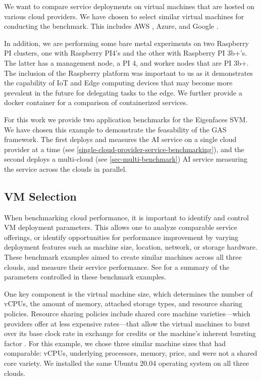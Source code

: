 We want to compare service
deployments on virtual machines that are hosted on various cloud
providers. We have chosen to select similar virtual machines for
conducting the benchmark. This includes AWS \cite{www-aws},
Azure\cite{www-azure}, and Google \cite{www-google}.

In addition, we are performing some bare metal experiments on two
Raspberry PI clusters, one with Raspberry PI4's and the other with
Raspberry PI 3b+'s. The latter has a management node, a PI 4, and
worker nodes that are PI 3b+. The inclusion of the Raspberry platform
was important to us as it demonstrates the capability of IoT and Edge
computing devices that may become more prevalent in the future for
delegating tasks to the edge. We further provide a docker container
for a comparison of containerized services.

For this work we provide two application benchmarks for the Eigenfaces
SVM. We have chosen this example to demonstrate the feasability of the
GAS framework.  The first deploys and measures the AI service on a
single cloud provider at a time
(see \ref{single-cloud-provider-service-benchmarking}), and the second
deploys a multi-cloud (see \ref{sec-multi-benchmark}) AI service
measuring the service across the clouds in parallel.




\subsection{VM Selection}\label{vm-selection}

When benchmarking cloud performance, it is important to identify and
control VM deployment parameters. This allows one to analyze
comparable service offerings, or identify opportunities for
performance improvement by varying deployment features such as machine
size, location, network, or storage hardware. These benchmark examples
aimed to create similar machines across all three clouds, and measure
their service performance. See  for a summary of the
parameters controlled in these benchmark examples.

One key component is the virtual machine size, which determines the
number of vCPUs, the amount of memory, attached storage types, and
resource sharing policies. Resource sharing policies include shared
core machine varieties—which providers offer at less expensive
rates—that allow the virtual machines to burst over its base clock
rate in exchange for credits or the machine's inherent bursting factor
\cite{amazon-instances,google-instances}. For this example, we chose
three similar machine sizes that had comparable: vCPUs, underlying
processors, memory, price, and were not a shared core variety. We
installed the same Ubuntu 20.04 operating system on all three clouds.

